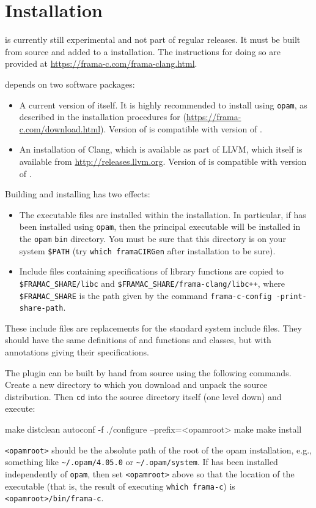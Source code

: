 

\chapter{Installation}

\fclang is currently still experimental and not part of regular \framac releases. It must be built from source and added to a \framac installation.
The instructions for doing so are provided at 
\url{https://frama-c.com/frama-clang.html}.

\fclang depends on two software packages:
\begin{itemize}
\item A current version of \framac itself. It is highly recommended to install \framac using \lstinline|opam|, as described in the installation procedures for \framac (\url{https://frama-c.com/download.html}). 
Version \fclangversion of \fclang is compatible with version \fcversion of \framac.
\item An installation of Clang, which is available as part of LLVM,
which itself is available from \url{http://releases.llvm.org}.
Version \fclangversion of \fclang is compatible with version \clangversion of \clang.
\end{itemize}

Building and installing \fclang has two effects:
\begin{itemize}
\item The \fclang executable files are installed within the \framac installation. 
In particular, if \framac has been installed using \lstinline|opam|, then the principal executable  \irg will be installed in the 
\lstinline|opam| \lstinline|bin| directory. 
You must be sure that this directory is on your system \verb|$PATH| (try \lstinline|which framaCIRGen| after installation to be sure).
\item Include files containing \acslpp specifications of \cpp library functions
are copied to \verb|$FRAMAC_SHARE/libc| and 
\verb|$FRAMAC_SHARE/frama-clang/libc++|, where \verb|$FRAMAC_SHARE| is the path
given by the command \lstinline|frama-c-config -print-share-path|.
\end{itemize}
These include files are replacements for the standard system include files.
They should have the same definitions of \C and \cpp functions and classes, but
with \acslpp annotations giving their specifications.

The plugin can be built by hand from source using the following commands. Create a new directory to which you download and unpack the source distribution. Then \lstinline|cd| into the source directory itself (one level down) and execute:
\begin{listing-nonumber}
make distclean
autoconf -f
./configure --prefix=<opamroot>
make
make install
\end{listing-nonumber}
\lstinline|<opamroot>| should be the absolute path of the root of the opam installation, e.g., something like \lstinline|~/.opam/4.05.0| or \lstinline|~/.opam/system|. If \framac has been installed independently of \lstinline|opam|, then set \lstinline|<opamroot>| above so that the location of the \framac executable (that is, the result of executing \lstinline|which frama-c|) is 
\lstinline|<opamroot>/bin/frama-c|.

